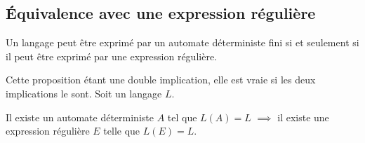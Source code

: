 \subsection{Équivalence avec une expression régulière}\label{ss:regexeq}

\begin{proposition}
	Un langage peut être exprimé par un automate déterministe fini si et seulement si il peut être exprimé par une expression régulière.
\end{proposition}

Cette proposition étant une double implication, elle est vraie si les deux implications le sont. Soit un langage $L$.


\begin{theorem}
	Il existe un automate déterministe $A$ tel que $L(A)=L$ $\implies$ il existe une expression régulière $E$ telle que $L(E)=L$.
\end{theorem}
